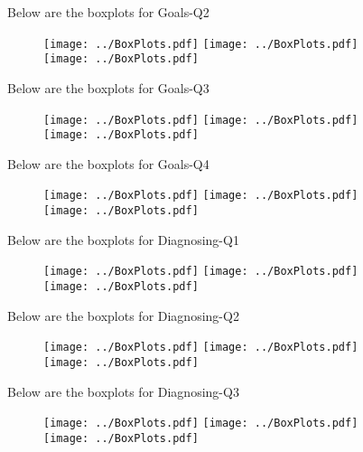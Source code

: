 \documentclass[11pt]{extarticle} %
\begin{document}
\newpage
Below are the boxplots for Goals-Q2
\begin{figure}[H]
\centering 
\texttt{[image: ../BoxPlots.pdf]} 
\texttt{[image: ../BoxPlots.pdf]} \\
\texttt{[image: ../BoxPlots.pdf]} \\
\end{figure}

\newpage
Below are the boxplots for Goals-Q3
\begin{figure}[H]
\centering 
\texttt{[image: ../BoxPlots.pdf]} 
\texttt{[image: ../BoxPlots.pdf]} \\
\texttt{[image: ../BoxPlots.pdf]} \\
\end{figure}

\newpage
Below are the boxplots for Goals-Q4
\begin{figure}[H]
\centering 
\texttt{[image: ../BoxPlots.pdf]} 
\texttt{[image: ../BoxPlots.pdf]} \\
\texttt{[image: ../BoxPlots.pdf]} \\
\end{figure}

\newpage
Below are the boxplots for Diagnosing-Q1
\begin{figure}[H]
\centering 
\texttt{[image: ../BoxPlots.pdf]} 
\texttt{[image: ../BoxPlots.pdf]} \\
\texttt{[image: ../BoxPlots.pdf]} \\
\end{figure}

\newpage
Below are the boxplots for Diagnosing-Q2
\begin{figure}[H]
\centering 
\texttt{[image: ../BoxPlots.pdf]} 
\texttt{[image: ../BoxPlots.pdf]} \\
\texttt{[image: ../BoxPlots.pdf]} \\
\end{figure}

\newpage
Below are the boxplots for Diagnosing-Q3
\begin{figure}[H]
\centering 
\texttt{[image: ../BoxPlots.pdf]} 
\texttt{[image: ../BoxPlots.pdf]} \\
\texttt{[image: ../BoxPlots.pdf]} \\
\end{figure}
\end{document}
